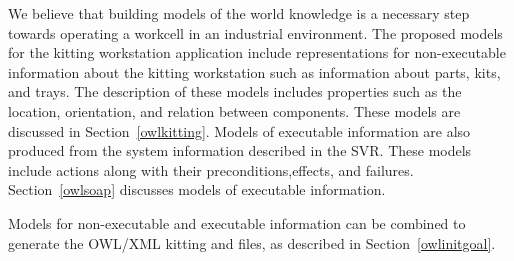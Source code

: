 We believe that building models of the world knowledge is a necessary step towards
operating a workcell in an industrial environment. The proposed models
for the kitting workstation application include
representations for non-executable information about the kitting workstation
such as information about parts, kits, and trays. The description of these
models includes properties such as the location, orientation, and relation
between components. These models are discussed in Section~\ref{owlkitting}.
Models of executable information are also produced from the system
information described in the SVR. These models include actions along
with their preconditions,effects, and failures.
Section~\ref{owlsoap} discusses models of executable information.

Models for non-executable and executable information can be
combined to generate the OWL/XML kitting  and 
files, as described in Section~\ref{owlinitgoal}.

